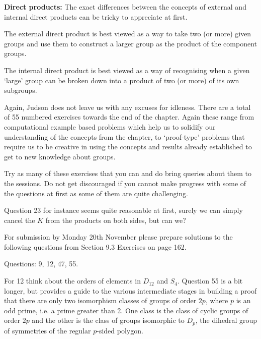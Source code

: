 \documentclass[oneside,10pt]{amsart}
\begin{document}
\textbf{Direct products:}
The exact differences between the concepts of external and internal direct products can be tricky to appreciate at first.

The external direct product is best viewed as a way to take two (or more) given groups and use them to construct a larger group as the product of the component groups.

The internal direct product is best viewed as a way of recognising when a given `large' group can be broken down into a product of two (or more) of its own subgroups.

Again, Judson does not leave us with any excuses for idleness. There are a total of 55 numbered exercises towards the end of the chapter. Again these range from computational example based problems which help us to solidify our understanding of the concepts from the chapter, to `proof-type' problems that require us to be creative in using the concepts and results already established to get to new knowledge about groups.

Try as many of these exercises that you can and do bring queries about them to the sessions. Do not get discouraged if you cannot make progress with some of the questions at first as some of them are quite challenging.

Question 23 for instance seems quite reasonable at first, surely we can simply cancel the $K$ from the products on both sides, but can we?

For submission by Monday 20th November please prepare solutions to the following questions from Section 9.3 Exercises on page 162.

Questions: 9, 12, 47, 55.

For 12 think about the orders of elements in $D_{12}$ and $S_4$. Question 55 is a bit longer, but provides a guide to the various intermediate stages in building a proof that there are only two isomorphism classes of groups of order $2p$, where $p$ is an odd prime, i.e. a prime greater than 2. One class is the class of cyclic groups of order $2p$ and the other is the class of groups isomorphic to $D_{p}$, the dihedral group of symmetries of the regular $p$-sided polygon. 
\end{document}
